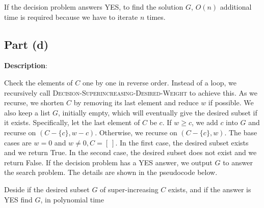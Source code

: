 \documentclass{article}
\begin{document}
If the decision problem answers YES, to find the solution $G$, $O(n)$ additional time is required because we have to iterate $n$ times.

\subsection{Part (d)}
\noindent\textbf{Description}:

Check the elements of $C$ one by one in reverse order. Instead of a loop, we recursively call \textsc{Decision-Superincreasing-Desired-Weight} to achieve this. As we recurse, we shorten $C$ by removing its last element and reduce $w$ if possible. We also keep a list $G$, initially empty, which will eventually give the desired subset if it exists. Specifically, let the last element of $C$ be $c$. If $w\geqslant c$, we add $c$ into $G$ and recurse on $(C-\{c\},w-c)$. Otherwise, we recurse on $(C-\{c\},w)$. The base cases are $w=0$ and $w\neq0,C=[~]$. In the first case, the desired subset exists and we return True. In the second case, the desired subset does not exist and we return False. If the decision problem has a YES answer, we output $G$ to answer the search problem. The details are shown in the pseudocode below.
\begin{algorithm}
\caption{Deside if the desired subset $G$ of super-increasing $C$ exists, and if the answer is YES find $G$, in polynomial time}
\begin{algorithmic}[1]
 
 
\Else{}
	\Else{}
	\EndIf
\EndIf
\EndProcedure

\Else{} 
\EndIf
\EndProcedure
\end{algorithmic}
\end{algorithm}

~
\end{document}
